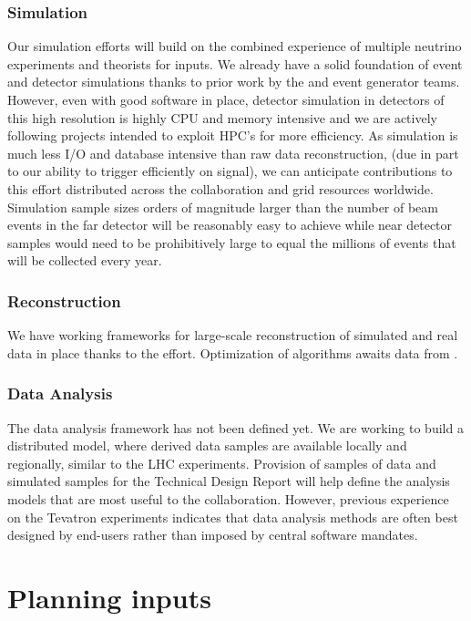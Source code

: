 \subsubsection{Simulation}  Our simulation efforts will build on the combined experience of multiple neutrino experiments and theorists for inputs.  We already have a solid foundation of event and detector simulations thanks to prior work by the  and event generator teams.  However,   even with good software in place, detector simulation in detectors of this high resolution is highly CPU and memory intensive and we are actively following projects intended to exploit HPC's for more efficiency.  As simulation is much less I/O and database intensive than raw data reconstruction, (due in part to our ability to trigger efficiently on signal), we can anticipate contributions to this effort distributed across the collaboration and grid resources worldwide. Simulation sample sizes orders of magnitude larger than the number of beam events  in the  far detector will be reasonably easy to achieve while near detector samples would need to be prohibitively large to equal the millions of events that will be collected every year. 

\subsubsection{Reconstruction} We have working frameworks for large-scale reconstruction of simulated and real data in place thanks to the  effort.  Optimization of algorithms awaits data from . 
 
 \subsubsection{Data Analysis}
 The  data analysis framework has not been defined yet.  We are working to build a distributed model, where derived data samples are available locally and regionally, similar to the LHC experiments.   Provision of samples  of  data and simulated samples for the Technical Design Report will help define the analysis models that are most useful to the collaboration. However,  previous experience on the Tevatron experiments indicates that data analysis methods are often best designed by end-users rather than imposed by central software mandates. 
 
 
\section{Planning inputs}


